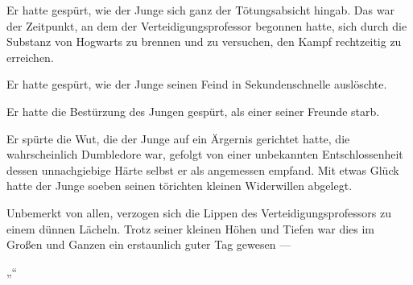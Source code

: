 Er hatte gespürt, wie der Junge sich ganz der Tötungsabsicht hingab. Das war der Zeitpunkt, an dem der Verteidigungsprofessor begonnen hatte, sich durch die Substanz von Hogwarts zu brennen und zu versuchen, den Kampf rechtzeitig zu erreichen.

Er hatte gespürt, wie der Junge seinen Feind in Sekundenschnelle auslöschte.

Er hatte die Bestürzung des Jungen gespürt, als einer seiner Freunde starb.

Er spürte die Wut, die der Junge auf ein Ärgernis gerichtet hatte, die wahrscheinlich Dumbledore war, gefolgt von einer unbekannten Entschlossenheit dessen unnachgiebige Härte selbst er als angemessen empfand. Mit etwas Glück hatte der Junge soeben seinen törichten kleinen Widerwillen abgelegt.

Unbemerkt von allen, verzogen sich die Lippen des Verteidigungsprofessors zu einem dünnen Lächeln. Trotz seiner kleinen Höhen und Tiefen war dies im Großen und Ganzen ein erstaunlich guter Tag gewesen —

„“

